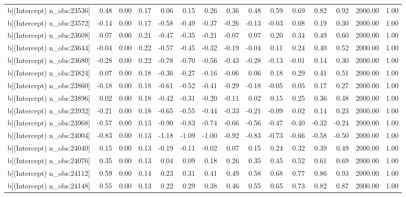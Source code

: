 \begin{table}[ht]
\begin{tabular}{rrrrrrrrrrrrrrr}
  b[(Intercept) n\_obs:23536] & 0.48 & 0.00 & 0.17 & 0.06 & 0.15 & 0.26 & 0.36 & 0.48 & 0.59 & 0.69 & 0.82 & 0.92 & 2000.00 & 1.00 \\ 
  b[(Intercept) n\_obs:23572] & -0.14 & 0.00 & 0.17 & -0.58 & -0.49 & -0.37 & -0.26 & -0.13 & -0.03 & 0.08 & 0.19 & 0.30 & 2000.00 & 1.00 \\ 
  b[(Intercept) n\_obs:23608] & 0.07 & 0.00 & 0.21 & -0.47 & -0.35 & -0.21 & -0.07 & 0.07 & 0.20 & 0.34 & 0.49 & 0.60 & 2000.00 & 1.00 \\ 
  b[(Intercept) n\_obs:23644] & -0.04 & 0.00 & 0.22 & -0.57 & -0.45 & -0.32 & -0.19 & -0.04 & 0.11 & 0.24 & 0.40 & 0.52 & 2000.00 & 1.00 \\ 
  b[(Intercept) n\_obs:23680] & -0.28 & 0.00 & 0.22 & -0.78 & -0.70 & -0.56 & -0.43 & -0.28 & -0.13 & -0.01 & 0.14 & 0.30 & 2000.00 & 1.00 \\ 
  b[(Intercept) n\_obs:23824] & 0.07 & 0.00 & 0.18 & -0.36 & -0.27 & -0.16 & -0.06 & 0.06 & 0.18 & 0.29 & 0.41 & 0.51 & 2000.00 & 1.00 \\ 
  b[(Intercept) n\_obs:23860] & -0.18 & 0.00 & 0.18 & -0.61 & -0.52 & -0.41 & -0.29 & -0.18 & -0.05 & 0.05 & 0.17 & 0.27 & 2000.00 & 1.00 \\ 
  b[(Intercept) n\_obs:23896] & 0.02 & 0.00 & 0.18 & -0.42 & -0.31 & -0.20 & -0.11 & 0.02 & 0.15 & 0.25 & 0.36 & 0.48 & 2000.00 & 1.00 \\ 
  b[(Intercept) n\_obs:23932] & -0.21 & 0.00 & 0.18 & -0.65 & -0.55 & -0.44 & -0.33 & -0.21 & -0.09 & 0.02 & 0.14 & 0.23 & 2000.00 & 1.00 \\ 
  b[(Intercept) n\_obs:23968] & -0.57 & 0.00 & 0.13 & -0.90 & -0.83 & -0.74 & -0.66 & -0.56 & -0.47 & -0.40 & -0.32 & -0.24 & 2000.00 & 1.00 \\ 
  b[(Intercept) n\_obs:24004] & -0.83 & 0.00 & 0.13 & -1.18 & -1.09 & -1.00 & -0.92 & -0.83 & -0.73 & -0.66 & -0.58 & -0.50 & 2000.00 & 1.00 \\ 
  b[(Intercept) n\_obs:24040] & 0.15 & 0.00 & 0.13 & -0.19 & -0.11 & -0.02 & 0.07 & 0.15 & 0.24 & 0.32 & 0.39 & 0.49 & 2000.00 & 1.00 \\ 
  b[(Intercept) n\_obs:24076] & 0.35 & 0.00 & 0.13 & 0.04 & 0.09 & 0.18 & 0.26 & 0.35 & 0.45 & 0.52 & 0.61 & 0.69 & 2000.00 & 1.00 \\ 
  b[(Intercept) n\_obs:24112] & 0.59 & 0.00 & 0.14 & 0.23 & 0.31 & 0.41 & 0.49 & 0.58 & 0.68 & 0.77 & 0.86 & 0.93 & 2000.00 & 1.00 \\ 
  b[(Intercept) n\_obs:24148] & 0.55 & 0.00 & 0.13 & 0.22 & 0.29 & 0.38 & 0.46 & 0.55 & 0.65 & 0.73 & 0.82 & 0.87 & 2000.00 & 1.00 \\ 

\end{tabular}
\end{table}
